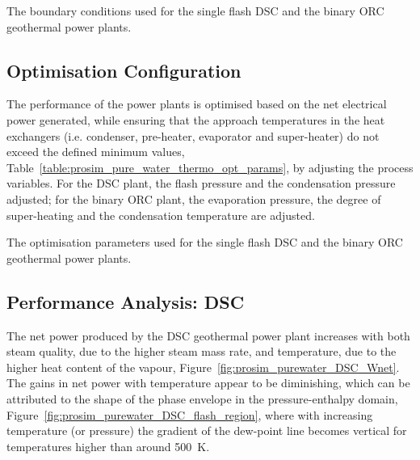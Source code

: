     \begin{table}[H]
        \centering
        \caption{The boundary conditions used for the single flash \ac{DSC} and the binary \ac{ORC} geothermal power plants.}
        \label{table:prosim_pure_water_boundary}
                
    \end{table}

\subsection{Optimisation Configuration}
    \label{sec:prosim_thermo_BCs}
    The performance of the power plants is optimised based on the net electrical power generated, while ensuring that the approach temperatures in the heat exchangers (i.e. condenser, pre-heater, evaporator and super-heater) do not exceed the defined minimum values, Table~\ref{table:prosim_pure_water_thermo_opt_params}, by adjusting the process variables. For the \ac{DSC} plant, the flash pressure and the condensation pressure adjusted; for the binary \ac{ORC} plant, the evaporation pressure, the degree of super-heating and the condensation temperature are adjusted.

    \begin{table}[H]
        \centering
        \caption{The optimisation parameters used for the single flash \ac{DSC} and the binary \ac{ORC} geothermal power plants.}
        \label{table:prosim_pure_water_thermo_opt_params}
                
    \end{table}
        
        
\subsection{Performance Analysis: DSC}
    \label{sec:thermo_opt_DSCresults}

    The net power produced by the \ac{DSC} geothermal power plant increases with both steam quality, due to the higher steam mass rate, and temperature, due to the higher heat content of the vapour, Figure~\ref{fig:prosim_purewater_DSC_Wnet}. The gains in net power with temperature appear to be diminishing, which can be attributed to the shape of the phase envelope in the pressure-enthalpy domain, Figure~\ref{fig:prosim_purewater_DSC_flash_region}, where with increasing temperature (or pressure) the gradient of the dew-point line becomes vertical for temperatures higher than around \qty{500}{\K}.

